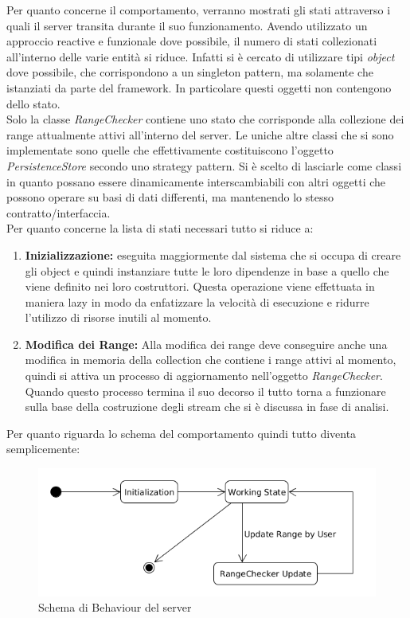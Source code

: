 Per quanto concerne il comportamento, verranno mostrati gli stati attraverso i quali il server transita durante il suo funzionamento. Avendo utilizzato un approccio reactive e funzionale dove possibile, il numero di stati collezionati all'interno delle varie entit\`a si riduce. Infatti si \`e cercato di utilizzare tipi \textit{object} dove possibile, che corrispondono a un singleton pattern, ma solamente che istanziati da parte del framework. In particolare questi oggetti non contengono dello stato.\\
Solo la classe \textit{RangeChecker} contiene uno stato che corrisponde alla collezione dei range attualmente attivi all'interno del server. Le uniche altre classi che si sono implementate sono quelle che effettivamente costituiscono l'oggetto \textit{PersistenceStore} secondo uno strategy pattern. Si \`e scelto di lasciarle come classi in quanto possano essere dinamicamente interscambiabili con altri oggetti che possono operare su basi di dati differenti, ma mantenendo lo stesso contratto/interfaccia.\\
Per quanto concerne la lista di stati necessari tutto si riduce a:
\begin{enumerate}
\item \textbf{Inizializzazione:} eseguita maggiormente dal sistema che si occupa di creare gli object e quindi instanziare tutte le loro dipendenze in base a quello che viene definito nei loro costruttori. Questa operazione viene effettuata in maniera lazy in modo da enfatizzare la velocit\`a di esecuzione e ridurre l'utilizzo di risorse inutili al momento.
  \item \textbf{Modifica dei Range:} Alla modifica dei range deve conseguire anche una modifica in memoria della collection che contiene i range attivi al momento, quindi si attiva un processo di aggiornamento nell'oggetto \textit{RangeChecker}. Quando questo processo termina il suo decorso il tutto torna a funzionare sulla base della costruzione degli stream che si \`e discussa in  fase di analisi.
\end{enumerate}

Per quanto riguarda lo schema del comportamento quindi tutto diventa semplicemente:

\begin{figure}[h]
\centering
\includegraphics[scale=0.5,natwidth=610,natheight=642]{Figures/Project/Server/Behaviour/DomoticRoomServerStateDiagram.png}
\caption{Schema di Behaviour del server}
\label{BehaviourServerSchema}
\end{figure}

